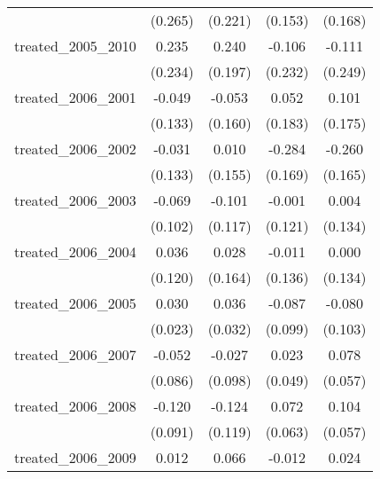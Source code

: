 {\begin{tabular}{l*{4}{c}}
            &     (0.265)         &     (0.221)         &     (0.153)         &     (0.168)         \\
[1em]
treated\_2005\_2010&       0.235         &       0.240         &      -0.106         &      -0.111         \\
            &     (0.234)         &     (0.197)         &     (0.232)         &     (0.249)         \\
[1em]
treated\_2006\_2001&      -0.049         &      -0.053         &       0.052         &       0.101         \\
            &     (0.133)         &     (0.160)         &     (0.183)         &     (0.175)         \\
[1em]
treated\_2006\_2002&      -0.031         &       0.010         &      -0.284         &      -0.260         \\
            &     (0.133)         &     (0.155)         &     (0.169)         &     (0.165)         \\
[1em]
treated\_2006\_2003&      -0.069         &      -0.101         &      -0.001         &       0.004         \\
            &     (0.102)         &     (0.117)         &     (0.121)         &     (0.134)         \\
[1em]
treated\_2006\_2004&       0.036         &       0.028         &      -0.011         &       0.000         \\
            &     (0.120)         &     (0.164)         &     (0.136)         &     (0.134)         \\
[1em]
treated\_2006\_2005&       0.030         &       0.036         &      -0.087         &      -0.080         \\
            &     (0.023)         &     (0.032)         &     (0.099)         &     (0.103)         \\
[1em]
treated\_2006\_2007&      -0.052         &      -0.027         &       0.023         &       0.078         \\
            &     (0.086)         &     (0.098)         &     (0.049)         &     (0.057)         \\
[1em]
treated\_2006\_2008&      -0.120         &      -0.124         &       0.072         &       0.104         \\
            &     (0.091)         &     (0.119)         &     (0.063)         &     (0.057)         \\
[1em]
treated\_2006\_2009&       0.012         &       0.066         &      -0.012         &       0.024         \\

\end{tabular}}
